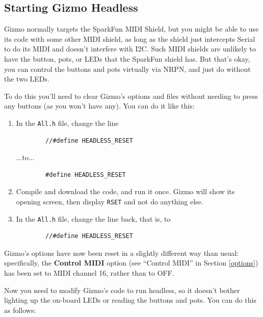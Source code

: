 \documentclass{article}
\begin{document}
\subsection{Starting Gizmo Headless}

Gizmo normally targets the SparkFun MIDI Shield, but you might be able to use its code with some other MIDI shield, as long as the shield just intercepts Serial to do its MIDI and doesn't interfere with I2C.  Such MIDI shields are unlikely to have the button, pots, or LEDs that the SparkFun shield has.  But that's okay, you can control the buttons and pots virtually via NRPN, and just do without the two LEDs.

To do this you'll need to clear Gizmo's options and files without needing to press any buttons (as you won't have any).  You can do it like this:

\begin{enumerate}
\item In the \texttt{All.h} file, change the line 
\begin{verbatim}
        //#define HEADLESS_RESET
\end{verbatim}
...to...
\begin{verbatim}
        #define HEADLESS_RESET
\end{verbatim}
\item Compile and download the code, and run it once.  Gizmo will show its opening screen, then display \texttt{RSET} and not do anything else.
\item In the \texttt{All.h} file, change the line back, that is, to 
\begin{verbatim}
        //#define HEADLESS_RESET
\end{verbatim}

\end{enumerate}

Gizmo's options have now been reset in a slightly different way than usual: specifically, the {\bf Control MIDI} option (see ``Control MIDI'' in Section \ref{options}) has been set to MIDI channel 16, rather than to OFF.

Now you need to modify Gizmo's code to run headless, so it doesn't bother lighting up the on-board LEDs or reading the buttons and pots.   You can do this as follows:
\end{document}

